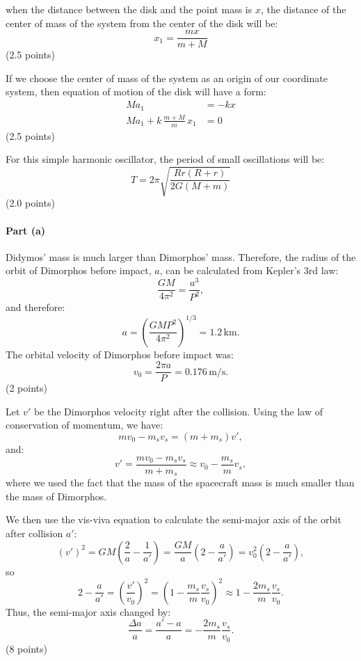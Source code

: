\begin{description}
  when the distance between the disk and the point mass is $x$, the distance
  of the center of mass of the system from the center of the disk will be:
  \[
    x_1 = \frac{mx}{m + M}
  \]
  \hfill(2.5 points)

  If we choose the center of mass of the system as an origin of our coordinate
  system, then equation of motion of the disk will have a form:
  \begin{align*}
    Ma_1 &= -kx \\
    Ma_1 + k\,\frac{m + M}{m}\,x_1 &= 0
  \end{align*}
  \hfill(2.5 points)

  For this simple harmonic oscillator, the period of small oscillations will
  be:
  \[
    T = 2\pi\sqrt{\frac{Rr(R + r)}{2G(M + m)}}
  \]
  \hfill(2.0 points)
\end{description}

\paragraph{Part (a)}

Didymos' mass is much larger than Dimorphos' mass. Therefore, the radius of
the orbit of Dimorphos before impact, $a$, can be calculated from Kepler's 3rd
law:
\[
  \frac{GM}{4\pi^2} = \frac{a^3}{P^2},
\]
and therefore:
\[
  a = \left(\frac{GMP^2}{4\pi^2}\right)^{1/3} = 1.2\,\mathrm{km}.
\]
The orbital velocity of Dimorphos before impact was:
\[
  v_0 = \frac{2\pi a}{P} = 0.176\,\mathrm{m/s}.
\]
\hfill(2 points)

Let $v'$ be the Dimorphos velocity right after the collision. Using the law of
conservation of momentum, we have:
\[
  mv_0 - m_s v_s = (m + m_s)v',
\]
and:
\[
  v' = \frac{mv_0 - m_s v_s}{m + m_s} \approx v_0 - \frac{m_s}{m}v_s,
\]
where we used the fact that the mass of the spacecraft mass is much smaller %
than the mass of Dimorphos.

We then use the vis-viva equation to calculate the semi-major axis of the
orbit after collision $a'$:
\[
  (v')^2 = GM\left(\frac{2}{a} - \frac{1}{a'}\right)
    = \frac{GM}{a}\left(2 - \frac{a}{a'}\right)
    = v_0^2\left(2 - \frac{a}{a'}\right),
\]
so
\[
  2 - \frac{a}{a'} = \left(\frac{v'}{v_0}\right)^2
    = \left(1 - \frac{m_s}{m}\frac{v_s}{v_0}\right)^2
    \approx 1 - \frac{2m_s}{m}\frac{v_s}{v_0}.
\]
Thus, the semi-major axis changed by:
\[
  \frac{\Delta a}{a} = \frac{a' - a}{a} = -\frac{2m_s}{m}\frac{v_s}{v_0}.
\]
\hfill(8 points)

